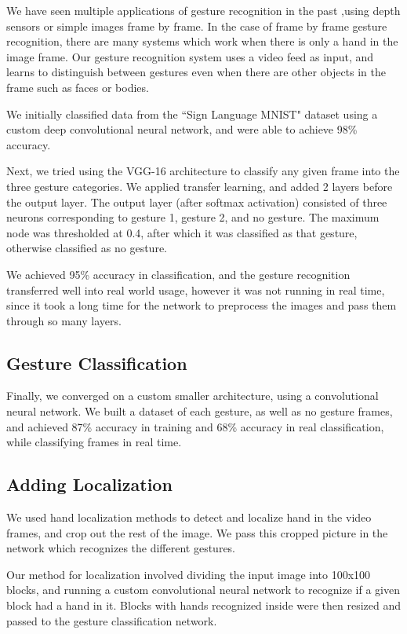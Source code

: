 \documentclass[10pt,twocolumn,letterpaper]{article}
\begin{document}
We have seen multiple applications of gesture recognition in the past ,using depth sensors or simple images frame by frame. In the case of frame by frame gesture recognition, there are many systems which work when there is only a hand in the image frame. Our gesture recognition system uses a video feed as input, and learns to distinguish between gestures even when there are other objects in the frame such as faces or bodies.

We initially classified data from the ``Sign Language MNIST" dataset using a custom deep convolutional neural network, and were able to achieve 98\% accuracy.

Next, we tried using the VGG-16 architecture to classify any given frame into the three gesture categories. We applied transfer learning, and added 2 layers before the output layer. The output layer (after softmax activation) consisted of three neurons corresponding to gesture 1, gesture 2, and no gesture. The maximum node was thresholded at 0.4, after which it was classified as that gesture, otherwise classified as no gesture.

We achieved 95\% accuracy in classification, and the gesture recognition transferred well into real world usage, however it was not running in real time, since it took a long time for the network to preprocess the images and pass them through so many layers.

\subsection{Gesture Classification}

Finally, we converged on a custom smaller architecture, using a convolutional neural network. We built a dataset of each gesture, as well as no gesture frames, and achieved 87\% accuracy in training and 68\% accuracy in real classification, while classifying frames in real time.

\subsection{Adding Localization}

We used hand localization methods to detect and localize hand in the video frames, and crop out the rest of the image. We pass this cropped picture in the network which recognizes the different gestures.

Our method for localization involved dividing the input image into 100x100 blocks, and running a custom convolutional neural network to recognize if a given block had a hand in it. Blocks with hands recognized inside were then resized and passed to the gesture classification network.
\end{document}
